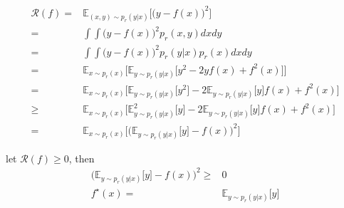 \documentclass[../main.tex]{subfiles}
\begin{document}
\begin{align*}
    \mathcal{R}(f)
    = & \mathbb{E}_{(x,y) \sim p_r(y|x)}
        \big[ \big( y -f(x) \big)^2 \big] \\
    = & \int \int \big( y - f(x) \big)^2
        p_r(x,y)dxdy \\
    = & \int \int \big( y - f(x) \big)^2
        p_r(y|x) p_r(x) dxdy \\
    = & \mathbb{E}_{x \sim p_r(x)} \big[
        \mathbb{E}_{y \sim p_r(y|x)} \big[
        y^2 -2yf(x) + f^2(x)
        \big] \big] \\
    = & \mathbb{E}_{x \sim p_r(x)} \big[
        \mathbb{E}_{y \sim p_r(y|x)} \big[
        y^2 \big]
        - 2 \mathbb{E}_{y \sim p_r(y|x)} \big[
        y \big] f(x)
        + f^2(x) \big] \\
    \ge & \mathbb{E}_{x \sim p_r(x)} \big[
        \mathbb{E}_{y \sim p_r(y|x)}^2 \big[
        y \big]
        - 2 \mathbb{E}_{y \sim p_r(y|x)} \big[
        y \big] f(x)
        + f^2(x) \big] \\
    = & \mathbb{E}_{x \sim p_r(x)} \big[
        \big( \mathbb{E}_{y \sim p_r(y|x)}\big[y\big]
        - f(x) \big)^2 \big]
\end{align*}

let
$\mathcal{R}(f) \ge 0$,
then
\begin{align*}
    \big( \mathbb{E}_{y \sim p_r(y|x)}\big[y\big]
        - f(x) \big)^2
    \ge & 0 \\
    f^\star(x)
    = & \mathbb{E}_{y \sim p_r(y|x)}
        \big[y\big]
\end{align*}
\end{document}
